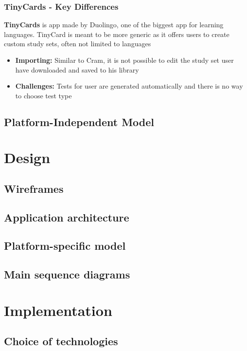 \documentclass[thesis=B,english]{FITthesis}[2012/10/20]
\begin{document}
\subsection{TinyCards - Key Differences}

\textbf{TinyCards} is app made by Duolingo, one of the biggest app for learning languages. TinyCard is meant to be more generic as it offers users to create custom study sets, often not limited to languages
	\begin{itemize}
		\item \textbf{Importing:} Similar to Cram, it is not possible to edit the study set user have downloaded and saved to his library
		\item \textbf{Challenges:} Tests for user are generated automatically and there is no way to choose test type
	\end{itemize}
	
\newpage
\section{Platform-Independent Model}
\subsection{}

\chapter{Design}
\section{Wireframes}
\section{Application architecture}
\section{Platform-specific model}
\section{Main sequence diagrams}

\chapter{Implementation}
\section{Choice of technologies}
\end{document}
